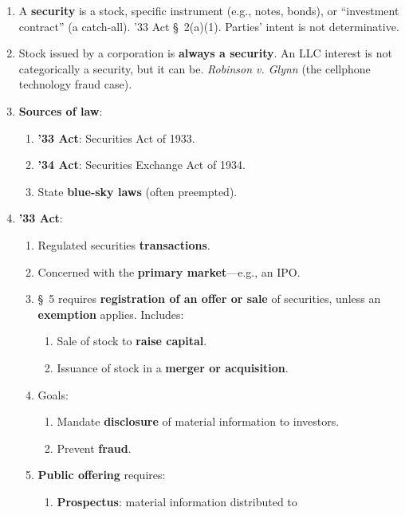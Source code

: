 \begin{enumerate}
    \item A \textbf{security} is a stock, specific instrument (e.g., notes, 
    bonds), or ``investment contract'' (a catch-all). '33 Act \S\ 2(a)(1). 
    Parties' intent is not determinative.
    \item Stock issued by a corporation is \textbf{always a security}. An LLC 
    interest is not categorically a security, but it can be. \emph{Robinson v. 
    Glynn} (the cellphone technology fraud case). %
    \item \textbf{Sources of law}:
    \begin{enumerate}
        \item \textbf{'33 Act}: Securities Act of 1933.
        \item \textbf{'34 Act}: Securities Exchange Act of 1934.
        \item State \textbf{blue-sky laws} (often preempted).
    \end{enumerate}
    \item \textbf{'33 Act}:
    \begin{enumerate}
        \item Regulated securities \textbf{transactions}.
        \item Concerned with the \textbf{primary market}---e.g., an IPO.
        \item \S\ 5 requires \textbf{registration of an offer or sale} of 
        securities, unless an \textbf{exemption} applies. Includes:
        \begin{enumerate}
            \item Sale of stock to \textbf{raise capital}.
            \item Issuance of stock in a \textbf{merger or acquisition}.
        \end{enumerate}
        \item Goals:
        \begin{enumerate}
            \item Mandate \textbf{disclosure} of material information to 
            investors.
            \item Prevent \textbf{fraud}.
        \end{enumerate}
        \item \textbf{Public offering} requires:
        \begin{enumerate}
            \item \textbf{Prospectus}: material information distributed to 

\end{enumerate}
\end{enumerate}
\end{enumerate}
